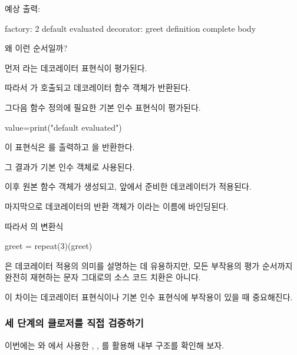 예상 출력:

\begin{dhkzsh}
factory: 2
default evaluated
decorator: greet
definition complete
body
\end{dhkzsh}

왜 이런 순서일까?

먼저 라는 데코레이터 표현식이 평가된다.

따라서 가 호출되고 데코레이터 함수 객체가 반환된다.

그다음 함수 정의에 필요한 기본 인수 표현식이 평가된다.

\begin{dhkcode}
value=print("default evaluated")
\end{dhkcode}

이 표현식은 를 출력하고 을 반환한다.

그 결과가 기본 인수 객체로 사용된다.

이후 원본  함수 객체가 생성되고, 앞에서 준비한 데코레이터가 적용된다.

마지막으로 데코레이터의 반환 객체가 이라는 이름에 바인딩된다.

따라서 의 변환식

\begin{dhkcode}
greet = repeat(3)(greet)
\end{dhkcode}

은 데코레이터 적용의 의미를 설명하는 데 유용하지만, 모든 부작용의 평가 순서까지 완전히 재현하는 문자 그대로의 소스 코드 치환은 아니다.

이 차이는 데코레이터 표현식이나 기본 인수 표현식에 부작용이 있을 때 중요해진다.

\subsubsection{세 단계의 클로저를 직접 검증하기}

이번에는 와 에서 사용한 , , 를 활용해 내부 구조를 확인해 보자.

